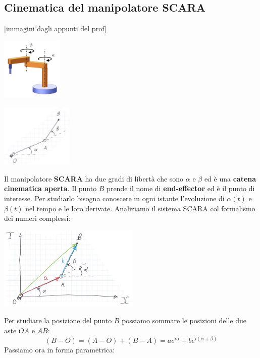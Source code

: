 \subsection{Cinematica del manipolatore SCARA}
[immagini dagli appunti del prof]
\begin{center}
    \includegraphics[height=3cm]{../lezione4/img7.JPG}
\end{center}
\begin{center}
    \includegraphics[height=3cm]{../lezione4/img8.JPG}
\end{center}
Il manipolatore \textbf{SCARA} ha due gradi di libertà che sono $\alpha$ e $\beta$ ed è una \textbf{catena cinematica aperta}. Il punto $B$ prende il nome di \textbf{end-effector} ed è il punto di interesse. Per studiarlo bisogna conoscere in ogni istante l'evoluzione di $\alpha(t)$ e $\beta(t)$ nel tempo e le loro derivate.\newline
\newline
Analiziamo il sistema SCARA col formalismo dei numeri complessi:
\begin{center}
    \includegraphics[height=4cm]{../lezione4/img9.JPG}
\end{center}
Per studiare la posizione del punto $B$ possiamo sommare le posizioni delle due aste $OA$ e $AB$:
\[
    (B-O) = (A-O) + (B-A) = a e^{i \alpha} + b e^{i(\alpha + \beta)}
\]
Passiamo ora in forma parametrica:
